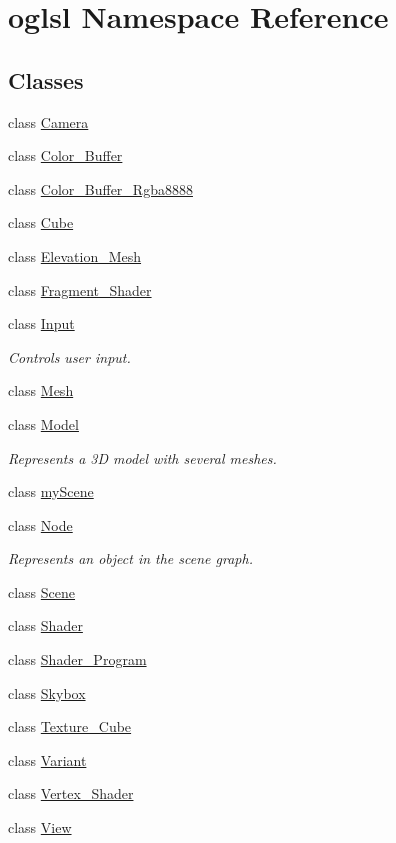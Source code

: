 \hypertarget{namespaceoglsl}{}\section{oglsl Namespace Reference}
\label{namespaceoglsl}
\subsection*{Classes}
\begin{DoxyCompactItemize}
\item 
class \mbox{\hyperlink{classoglsl_1_1_camera}{Camera}}
\item 
class \mbox{\hyperlink{classoglsl_1_1_color___buffer}{Color\+\_\+\+Buffer}}
\item 
class \mbox{\hyperlink{classoglsl_1_1_color___buffer___rgba8888}{Color\+\_\+\+Buffer\+\_\+\+Rgba8888}}
\item 
class \mbox{\hyperlink{classoglsl_1_1_cube}{Cube}}
\item 
class \mbox{\hyperlink{classoglsl_1_1_elevation___mesh}{Elevation\+\_\+\+Mesh}}
\item 
class \mbox{\hyperlink{classoglsl_1_1_fragment___shader}{Fragment\+\_\+\+Shader}}
\item 
class \mbox{\hyperlink{classoglsl_1_1_input}{Input}}
\begin{DoxyCompactList}\small\item\em Controls user input. \end{DoxyCompactList}\item 
class \mbox{\hyperlink{classoglsl_1_1_mesh}{Mesh}}
\item 
class \mbox{\hyperlink{classoglsl_1_1_model}{Model}}
\begin{DoxyCompactList}\small\item\em Represents a 3D model with several meshes. \end{DoxyCompactList}\item 
class \mbox{\hyperlink{classoglsl_1_1my_scene}{my\+Scene}}
\item 
class \mbox{\hyperlink{classoglsl_1_1_node}{Node}}
\begin{DoxyCompactList}\small\item\em Represents an object in the scene graph. \end{DoxyCompactList}\item 
class \mbox{\hyperlink{classoglsl_1_1_scene}{Scene}}
\item 
class \mbox{\hyperlink{classoglsl_1_1_shader}{Shader}}
\item 
class \mbox{\hyperlink{classoglsl_1_1_shader___program}{Shader\+\_\+\+Program}}
\item 
class \mbox{\hyperlink{classoglsl_1_1_skybox}{Skybox}}
\item 
class \mbox{\hyperlink{classoglsl_1_1_texture___cube}{Texture\+\_\+\+Cube}}
\item 
class \mbox{\hyperlink{classoglsl_1_1_variant}{Variant}}
\item 
class \mbox{\hyperlink{classoglsl_1_1_vertex___shader}{Vertex\+\_\+\+Shader}}
\item 
class \mbox{\hyperlink{classoglsl_1_1_view}{View}}
\end{DoxyCompactItemize}
